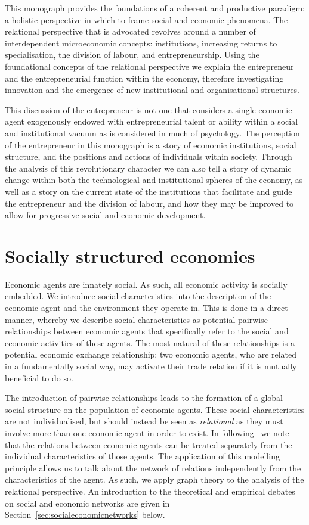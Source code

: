 \medskip \noindent This monograph provides the foundations of a coherent and productive paradigm; a holistic perspective in which to frame social and economic phenomena. The relational perspective that is advocated revolves around a number of interdependent microeconomic concepts: institutions, increasing returns to specialisation, the division of labour, and entrepreneurship. Using the foundational concepts of the relational perspective we explain the entrepreneur and the entrepreneurial function within the economy, therefore investigating innovation and the emergence of new institutional and organisational structures.

This discussion of the entrepreneur is not one that considers a single economic agent exogenously endowed with entrepreneurial talent or ability within a social and institutional vacuum as is considered in much of psychology. The perception of the entrepreneur in this monograph is a story of economic institutions, social structure, and the positions and actions of individuals within society. Through the analysis of this revolutionary character we can also tell a story of dynamic change within both the technological and institutional spheres of the economy, as well as a story on the current state of the institutions that facilitate and guide the entrepreneur and the division of labour, and how they may be improved to allow for progressive social and economic development.

\section{Socially structured economies}

Economic agents are innately social. As such, all economic activity is socially embedded. We introduce social characteristics into the description of the economic agent and the environment they operate in. This is done in a direct manner, whereby we describe social characteristics as potential pairwise relationships between economic agents that specifically refer to the social and economic activities of these agents. The most natural of these relationships is a potential economic exchange relationship: two economic agents, who are related in a fundamentally social way, may activate their trade relation if it is mutually beneficial to do so.

The introduction of pairwise relationships leads to the formation of a global social structure on the population of economic agents. These social characteristics are not individualised, but should instead be seen as \emph{relational} as they must involve more than one economic agent in order to exist. In following~\citep{Gilles1990} we note that the relations between economic agents can be treated separately from the individual characteristics of those agents. The application of this modelling principle allows us to talk about the network of relations independently from the characteristics of the agent. As such, we apply graph theory to the analysis of the relational perspective. An introduction to the theoretical and empirical debates on social and economic networks are given in Section~\ref{sec:socialeconomicnetworks} below.

